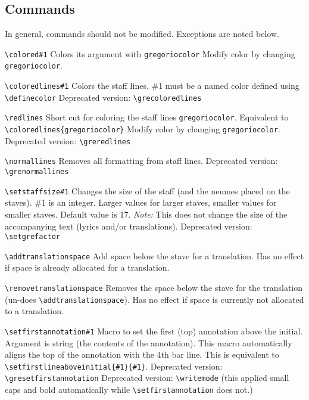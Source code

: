 \subsection{Commands}

In general, commands should not be modified.  Exceptions are noted below.

\verb=\colored#1=%
	Colors its argument with \verb=gregoriocolor=
	Modify color by changing \verb=gregoriocolor=.

\verb=\coloredlines#1=%
	Colors the staff lines.
	\#1 must be a named color defined using \verb=\definecolor=
	Deprecated version: \verb=\grecoloredlines=

\verb=\redlines=%
	Short cut for coloring the staff lines \verb=gregoriocolor=.  Equivalent to \verb=\coloredlines{gregoriocolor}=
	Modify color by changing \verb=gregoriocolor=.
	Deprecated version: \verb=\greredlines=

\verb=\normallines=%
	Removes all formatting from staff lines.
	Deprecated version: \verb=\grenormallines=

\verb=\setstaffsize#1=%
	Changes the size of the staff (and the neumes placed on the staves).  \#1 is an integer. Larger values for larger staves, smaller values for smaller staves.  Default value is 17.  \emph{Note:} This does not change the size of the accompanying text (lyrics and/or translations).
	Deprecated version: \verb=\setgrefactor=

\verb=\addtranslationspace=%
	Add space below the stave for a translation.  Has no effect if space is already allocated for a translation.

\verb=\removetranslationspace=%
	Removes the space below the stave for the translation (un-does \verb=\addtranslationspace=).  Has no effect if space is currently not allocated to a translation.

\verb=\setfirstannotation#1=%
	Macro to set the first (top) annotation above the initial.  Argument is string (the contents of the annotation).  This macro automatically aligns the top of the annotation with the 4th bar line.  This is equivalent to \verb=\setfirstlineaboveinitial{#1}{#1}=.
	Deprecated version: \verb=\gresetfirstannotation=
	Deprecated version: \verb=\writemode= (\nb this applied small caps and bold automatically while \verb=\setfirstannotation= does not.)%

